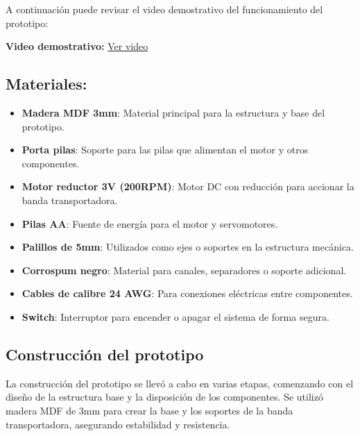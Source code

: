 A continuación puede revisar el video demostrativo del funcionamiento del prototipo:

\begin{center}
    \textbf{Video demostrativo:}  
    \href{https://utpedupe-my.sharepoint.com/:v:/g/personal/u22233575_utp_edu_pe/ESdkn_1TnllGkt0cGerWwMgBXVQGKYCcalTcEf6V_v72PA?nav=eyJyZWZlcnJhbEluZm8iOnsicmVmZXJyYWxBcHAiOiJPbmVEcml2ZUZvckJ1c2luZXNzIiwicmVmZXJyYWxBcHBQbGF0Zm9ybSI6IldlYiIsInJlZmVycmFsTW9kZSI6InZpZXciLCJyZWZlcnJhbFZpZXciOiJNeUZpbGVzTGlua0NvcHkifX0&e=CYh8pB }{Ver video}
\end{center}

\subsection{Materiales:}

\begin{itemize}
    \item \textbf{Madera MDF 3mm}: Material principal para la estructura y base del prototipo.
    \item \textbf{Porta pilas}: Soporte para las pilas que alimentan el motor y otros componentes.
    \item \textbf{Motor reductor 3V (200RPM)}: Motor DC con reducción para accionar la banda transportadora.
    \item \textbf{Pilas AA}: Fuente de energía para el motor y servomotores.
    \item \textbf{Palillos de 5mm}: Utilizados como ejes o soportes en la estructura mecánica.
    \item \textbf{Corrospum negro}: Material para canales, separadores o soporte adicional.
    \item \textbf{Cables de calibre 24 AWG}: Para conexiones eléctricas entre componentes.
    \item \textbf{Switch}: Interruptor para encender o apagar el sistema de forma segura.
\end{itemize}

\subsection{Construcción del prototipo}

La construcción del prototipo se llevó a cabo en varias etapas, comenzando con el diseño de la estructura base y la disposición de los componentes. Se utilizó madera MDF de 3mm para crear la base y los soportes de la banda transportadora, asegurando estabilidad y resistencia.

